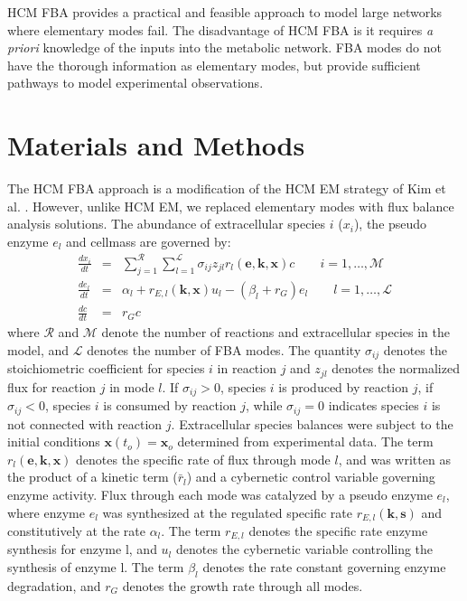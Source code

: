 \documentclass[10pt,twocolumn,twoside,final]{IEEEtran}
\begin{document}
HCM FBA provides a practical and feasible approach to model large networks where elementary modes fail.
The disadvantage of HCM FBA is it requires \textit{a priori} knowledge of the inputs into the metabolic network.
FBA modes do not have the thorough information as elementary modes, but provide sufficient pathways to model experimental observations.

\section{Materials and Methods}
The HCM FBA approach is a modification of the HCM EM strategy of Kim et al. \cite{2008_kim_varner_ramkrishna_BiotechProg}. However, unlike HCM EM, we replaced elementary modes with flux balance analysis solutions. The abundance of extracellular species $i$ ($x_{i}$), the pseudo enzyme $e_{l}$ and cellmass are governed by:
\begin{eqnarray}\nonumber
	\frac{dx_{i}}{dt}  & = &  \sum_{j = 1}^{\mathcal{R}}\sum_{l = 1}^{\mathcal{L}}\sigma_{ij}z_{jl}r_{l}\left(\mathbf{e},\mathbf{k},\mathbf{x}\right)c \qquad{i=1,\hdots,\mathcal{M}}\\\nonumber
  \frac{de_{l}}{dt}  & = & \alpha_{l} + r_{E,l}\left(\mathbf{k},\mathbf{x}\right)u_{l} - \left(\beta_{l}+r_{G}\right)e_{l} \qquad l=1,\hdots,\mathcal{L} \\\nonumber
  \frac{dc}{dt} & = & r_{G}c
\end{eqnarray}
where $\mathcal{R}$ and $\mathcal{M}$ denote the number of reactions and extracellular species in the model, and $\mathcal{L}$ denotes the number of FBA modes.
The quantity $\sigma_{ij}$ denotes the stoichiometric coefficient for species $i$ in reaction $j$ and $z_{jl}$ denotes the normalized flux for reaction $j$ in mode $l$.
If $\sigma_{ij}>0$, species $i$ is produced by reaction $j$,
if $\sigma_{ij}<0$, species $i$ is consumed by reaction $j$, while $\sigma_{ij} = 0$ indicates species $i$ is not connected with reaction $j$.
Extracellular species balances were subject to the initial conditions $\mathbf{x}\left(t_{o}\right) = \mathbf{x}_{o}$ determined from experimental data.
The term $r_{l}\left(\mathbf{e},\mathbf{k},\mathbf{x}\right)$ denotes the specific rate of flux through mode $l$, and was written as the product of a kinetic term ($\bar{r}_{l}$) and a cybernetic control variable governing enzyme activity. Flux through each mode was catalyzed by a pseudo enzyme $e_{l}$, where enzyme $e_{l}$ was synthesized at the regulated specific rate $r_{E,l}\left(\mathbf{k},\mathbf{s}\right)$ and constitutively at the rate $\alpha_{l}$. The term $r_{E,l}$ denotes the specific rate enzyme synthesis for enzyme l, and $u_{l}$ denotes the cybernetic variable controlling the synthesis of enzyme l. The term $\beta_{l}$ denotes the rate constant governing enzyme degradation, and $r_{G}$ denotes the growth rate through all modes.
\end{document}
